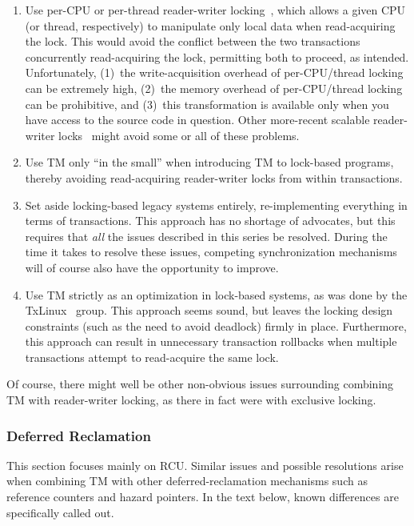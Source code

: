 \begin{enumerate}
\item	Use per-CPU or per-thread reader-writer
	locking~\cite{WilsonCHsieh92a}, which allows a
	given CPU (or thread, respectively) to manipulate only local
	data when read-acquiring the lock.
	This would avoid the conflict between the two transactions
	concurrently read-acquiring the lock, permitting both to proceed,
	as intended.
	Unfortunately, (1)~the write-acquisition overhead of
	per-CPU/thread locking can be extremely high, (2)~the memory
	overhead of per-CPU/thread locking can be prohibitive, and
	(3)~this transformation is available only when you have access to
	the source code in question.
	Other more-recent scalable
	reader-writer locks~\cite{YossiLev2009SNZIrwlock}
	might avoid some or all of these problems.
\item	Use TM only ``in the small'' when introducing TM to lock-based
	programs, thereby avoiding read-acquiring reader-writer locks
	from within transactions.
\item	Set aside locking-based legacy systems entirely, re-implementing
	everything in terms of transactions.
	This approach has no shortage of advocates, but this requires
	that \emph{all} the issues described in this series be resolved.
	During the time it takes to resolve these issues, competing
	synchronization mechanisms will of course also have the
	opportunity to improve.
\item	Use TM strictly as an optimization in lock-based systems, as was
	done by the TxLinux~\cite{ChistopherJRossbach2007a} group.
	This approach seems sound, but leaves the locking design
	constraints (such as the need to avoid deadlock) firmly in place.
	Furthermore, this approach can result in unnecessary transaction
	rollbacks when multiple transactions attempt to read-acquire
	the same lock.
\end{enumerate}

Of course, there might well be other non-obvious issues surrounding
combining TM with reader-writer locking, as there in fact were with
exclusive locking.

\subsubsection{Deferred Reclamation}
\label{sec:future:Deferred Reclamation}

This section focuses mainly on RCU.
Similar issues and possible resolutions arise when combining TM with
other deferred-reclamation mechanisms such as reference counters and
hazard pointers.
In the text below, known differences are specifically called out.

